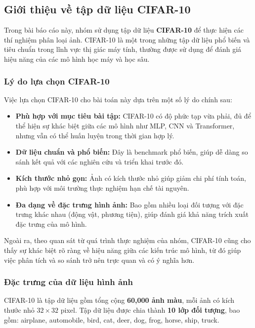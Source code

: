 \subsection{Giới thiệu về tập dữ liệu CIFAR-10}

Trong bài báo cáo này, nhóm sử dụng tập dữ liệu \textbf{CIFAR-10} \cite{krizhevsky2009learning} để thực hiện các thí nghiệm phân loại ảnh. CIFAR-10 là một trong những tập dữ liệu phổ biến và tiêu chuẩn trong lĩnh vực thị giác máy tính, thường được sử dụng để đánh giá hiệu năng của các mô hình học máy và học sâu.

\subsubsection{Lý do lựa chọn CIFAR-10}

Việc lựa chọn CIFAR-10 cho bài toán này dựa trên một số lý do chính sau:

\begin{itemize}
\item \textbf{Phù hợp với mục tiêu bài tập:} CIFAR-10 có độ phức tạp vừa phải, đủ để thể hiện sự khác biệt giữa các mô hình như MLP, CNN và Transformer, nhưng vẫn có thể huấn luyện trong thời gian hợp lý.
\item \textbf{Dữ liệu chuẩn và phổ biến:} Đây là benchmark phổ biến, giúp dễ dàng so sánh kết quả với các nghiên cứu và triển khai trước đó.
\item \textbf{Kích thước nhỏ gọn:} Ảnh có kích thước nhỏ giúp giảm chi phí tính toán, phù hợp với môi trường thực nghiệm hạn chế tài nguyên.
\item \textbf{Đa dạng về đặc trưng hình ảnh:} Bao gồm nhiều loại đối tượng với đặc trưng khác nhau (động vật, phương tiện), giúp đánh giá khả năng trích xuất đặc trưng của mô hình.
\end{itemize}

Ngoài ra, theo quan sát từ quá trình thực nghiệm của nhóm, CIFAR-10 cũng cho thấy sự khác biệt rõ ràng về hiệu năng giữa các kiến trúc mô hình, từ đó giúp việc phân tích và so sánh trở nên trực quan và có ý nghĩa hơn.

\subsubsection{Đặc trưng của dữ liệu hình ảnh}

CIFAR-10 là tập dữ liệu gồm tổng cộng \textbf{60,000 ảnh màu}, mỗi ảnh có kích thước nhỏ $32 \times 32$ pixel. Tập dữ liệu được chia thành \textbf{10 lớp đối tượng}, bao gồm: airplane, automobile, bird, cat, deer, dog, frog, horse, ship, truck.


